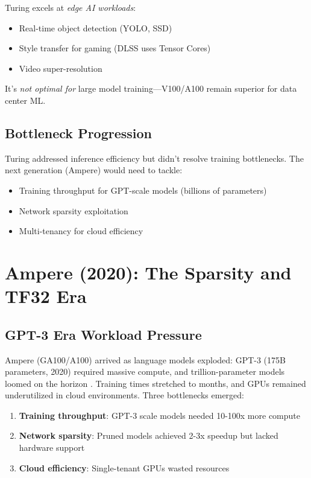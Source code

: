 \documentclass{article}
\begin{document}
Turing excels at \textit{edge AI workloads}:
\begin{itemize}
\item Real-time object detection (YOLO, SSD)
\item Style transfer for gaming (DLSS uses Tensor Cores)
\item Video super-resolution
\end{itemize}

It's \textit{not optimal for} large model training—V100/A100 remain superior for data center ML.

\subsection{Bottleneck Progression}

Turing addressed inference efficiency but didn't resolve training bottlenecks. The next generation (Ampere) would need to tackle:
\begin{itemize}
\item Training throughput for GPT-scale models (billions of parameters)
\item Network sparsity exploitation
\item Multi-tenancy for cloud efficiency
\end{itemize}

\section{Ampere (2020): The Sparsity and TF32 Era}

\subsection{GPT-3 Era Workload Pressure}

Ampere (GA100/A100) arrived as language models exploded: GPT-3 (175B parameters, 2020) required massive compute, and trillion-parameter models loomed on the horizon \cite{brown2020language}. Training times stretched to months, and GPUs remained underutilized in cloud environments. Three bottlenecks emerged:

\begin{enumerate}
\item \textbf{Training throughput}: GPT-3 scale models needed 10-100x more compute
\item \textbf{Network sparsity}: Pruned models achieved 2-3x speedup but lacked hardware support
\item \textbf{Cloud efficiency}: Single-tenant GPUs wasted resources
\end{enumerate}
\end{document}
